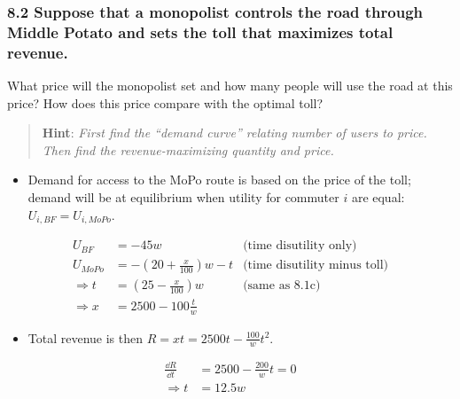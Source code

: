\documentclass[]{article}
\providecommand{\tightlist}{%
  \setlength{\itemsep}{0pt}\setlength{\parskip}{0pt}}
\begin{document}
\subsubsection{8.2 Suppose that a monopolist controls the road through
Middle Potato and sets the toll that maximizes total
revenue.}\label{suppose-that-a-monopolist-controls-the-road-through-middle-potato-and-sets-the-toll-that-maximizes-total-revenue.}

What price will the monopolist set and how many people will use the road
at this price? How does this price compare with the optimal toll?

\begin{quote}
\textbf{Hint}: \emph{First find the ``demand curve'' relating number of
users to price. Then find the revenue-maximizing quantity and price.}
\end{quote}

\begin{itemize}
\tightlist
\item
  Demand for access to the MoPo route is based on the price of the toll;
  demand will be at equilibrium when utility for commuter \(i\) are
  equal: \(U_{i,BF} = U_{i,MoPo}\).
\end{itemize}

\begin{align*}
  U_{BF}   &= -45w 
    &\text{(time disutility only)}\\
  U_{MoPo} &= -(20 + \frac{x}{100})w - t
    &\text{(time disutility minus toll)}\\
  \Rightarrow t &= (25 - \frac{x}{100})w &\text{(same as 8.1c)}\\
  \Rightarrow x &= 2500 - 100\frac{t}{w}
\end{align*}

\begin{itemize}
\tightlist
\item
  Total revenue is then \(R = xt = 2500t - \frac{100}{w}t^2\).
\end{itemize}

\begin{align*}
  \frac{\dd R}{\dd t} &= 2500 - \frac{200}{w}t = 0\\
  \Rightarrow t &= 12.5w
\end{align*}
\end{document}

